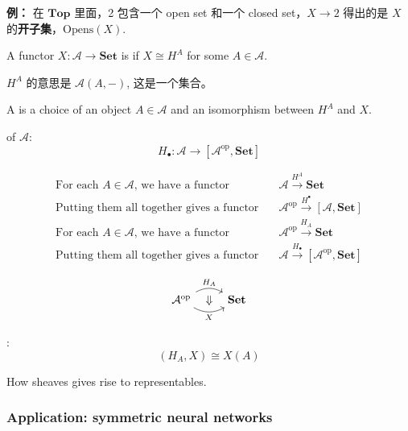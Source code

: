 \textbf{例：} 在 $\mathbf{Top}$ 里面，2 包含一个 open set 和一个 closed set，$X \rightarrow 2$ 得出的是 $X$ 的\textbf{开子集}，$\mathrm{Opens}(X)$.

A functor $X: \mathcal{A} \rightarrow \mathbf{Set}$ is  if $X \cong H^A$ for some $A \in \mathcal{A}$.

$H^A$ 的意思是 $\mathcal{A}(A, -)$, 这是一个集合。 

A  is a choice of an object $A \in \mathcal{A}$ and an isomorphism between $H^A$ and $X$. 

 of $\mathcal{A}$:
\begin{equation}
H_{\bullet}: \mathcal{A} \rightarrow [\mathcal{A}^{\mathrm{op}} , \mathbf{Set}]
\end{equation}

\begin{align}
\mbox{For each } A \in \mathcal{A} \mbox{, we have a functor} \quad
& \mathcal{A} \stackrel{H^A}{\longrightarrow} \mathbf{Set} \nonumber \\
\mbox{Putting them all together gives a functor} \quad
& \mathcal{A}^{\mathrm{op}} \stackrel{H^{\bullet}}{\longrightarrow} [\mathcal{A} , \mathbf{Set}] \\[10pt]
\mbox{For each } A \in \mathcal{A} \mbox{, we have a functor} \quad
& \mathcal{A}^{\mathrm{op}} \stackrel{H_A}{\longrightarrow} \mathbf{Set} \nonumber \\
\mbox{Putting them all together gives a functor} \quad
& \mathcal{A} \stackrel{H_{\bullet}}{\longrightarrow} [\mathcal{A}^{\mathrm{op}} , \mathbf{Set}] \nonumber
\end{align}

\begin{equation}
\begin{tikzcd}
\mathcal{A}^{\mathrm{op}} 
\arrow[r, bend left=30, "H_A"]
\arrow[r, bend right=30, swap, "X"]
\arrow[r, phantom, "\Downarrow"]
& \mathbf{Set}
\end{tikzcd}
\end{equation}

:
\begin{equation}
[\mathcal{A}^{\mathrm{op}} , \mathbf{Set}] (H_A, X) \cong X(A)
\end{equation}

How sheaves gives rise to representables.

\subsubsection{Application: symmetric neural networks}


